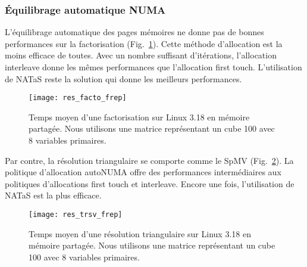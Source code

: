 \subsubsection{\'Equilibrage automatique NUMA}

L'équilibrage automatique des pages mémoires ne donne pas de bonnes performances sur la factorisation (Fig.~\ref{fig:res_facto_frep}).
%
Cette méthode d'allocation est la moins efficace de toutes.
%
Avec un nombre suffisant d'itérations, l'allocation interleave donne les mêmes performances que l'allocation first touch.
%
L'utilisation de NATaS reste la solution qui donne les meilleurs performances.


\begin{figure}
  \centering
  \texttt{[image: res\_facto\_frep]}
  \caption{Temps moyen d'une factorisation sur Linux 3.18 en mémoire partagée. Nous utilisons une matrice représentant un cube 100 avec 8 variables primaires.}
  \label{fig:res_facto_frep}
\end{figure}

Par contre, la résolution triangulaire se comporte comme le SpMV (Fig.~\ref{fig:res_trsv_frep}).
%
La politique d'allocation autoNUMA offre des performances intermédiaires aux politiques d'allocations first touch et interleave.
%
Encore une fois, l'utilisation de NATaS est la plus efficace.


\begin{figure}
  \centering
  \texttt{[image: res\_trsv\_frep]}
  \caption{Temps moyen d'une résolution triangulaire sur Linux 3.18 en mémoire partagée. Nous utilisons une matrice représentant un cube 100 avec 8 variables primaires.}
  \label{fig:res_trsv_frep}
\end{figure}
